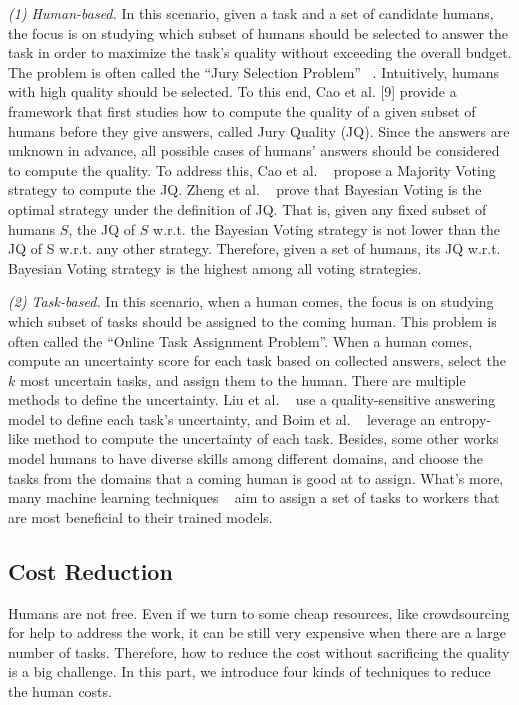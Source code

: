  \textit{(1) Human-based.}
 In this scenario, given a task and a set of candidate humans, the focus is on studying which subset of humans should be selected to answer the task in order to maximize the task’s quality without exceeding the overall budget. The problem is often called the “Jury Selection Problem” ~\cite{DBLP:journals/pvldb/CaoSTC12, DBLP:conf/edbt/ZhengCMM15}. Intuitively, humans with high quality should be selected.  To this end, Cao et al. [9] provide a framework that first studies how to compute the quality of a given subset of humans before they give  answers, called Jury Quality (JQ).  Since the answers are unknown in advance,  all possible cases of humans’ answers should be considered to compute the quality. To address this, Cao et al. ~\cite{DBLP:journals/pvldb/CaoSTC12} propose  a Majority Voting strategy to compute the JQ. Zheng et al. ~\cite{DBLP:conf/edbt/ZhengCMM15} prove that Bayesian Voting is the optimal strategy under the definition of JQ. That is, given any fixed subset of humans $S$, the JQ of $S$ w.r.t. the Bayesian Voting strategy is not lower than the JQ of S w.r.t. any other strategy. Therefore,  given a set of humans, its JQ w.r.t. Bayesian Voting strategy is the highest among all voting strategies.
 
  \textit{(2) Task-based.}
  In this scenario, when a human comes, the focus is on studying which subset of tasks should be assigned to the coming human. This problem is often called the “Online Task Assignment Problem”.
  When a human comes, ~\cite{DBLP:cdas, DBLP:conf/icde/BoimGMNPT12} compute an uncertainty score for each task based on collected answers, select the $k$ most uncertain tasks, and assign them to the human. There are multiple methods to define the uncertainty. Liu et al. ~\cite{DBLP:cdas} use a quality-sensitive answering model to define each task’s uncertainty, and Boim et al.  ~\cite{DBLP:conf/icde/BoimGMNPT12} leverage an entropy-like method to compute the uncertainty of each task. 
  Besides, some other works ~\cite{DBLP:conf/edbt/ZhaoWZCN15, DBLP:conf/kdd/ZhaoYNG13}   model humans to have diverse skills among different domains, and choose the tasks from the domains that a coming human is good at to assign.
  What's more, many machine learning techniques  ~\cite{DBLP:conf/icml/HoJV13, DBLP:conf/ijcai/ZhongTZ15, DBLP:journals/pvldb/MozafariSFJM14}  aim to assign a set of tasks to workers that are most beneficial to their trained models. 
  
 

\subsection{Cost Reduction}\label{subsec:cost}
Humans are not free. Even if we  turn to  some cheap resources, like crowdsourcing for help to address the work, it can be still very expensive when there are a large number of tasks.  Therefore,  how  to reduce the cost  without sacrificing the quality is a big challenge. In this part,  we introduce four kinds of techniques to reduce the human costs.

